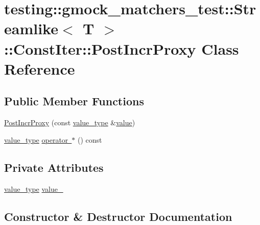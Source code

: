 \hypertarget{classtesting_1_1gmock__matchers__test_1_1_streamlike_1_1_const_iter_1_1_post_incr_proxy}{}\section{testing\+::gmock\+\_\+matchers\+\_\+test\+::Streamlike$<$ T $>$\+::Const\+Iter\+::Post\+Incr\+Proxy Class Reference}
\label{classtesting_1_1gmock__matchers__test_1_1_streamlike_1_1_const_iter_1_1_post_incr_proxy}
\subsection*{Public Member Functions}
\begin{DoxyCompactItemize}
\item 
\mbox{\hyperlink{classtesting_1_1gmock__matchers__test_1_1_streamlike_1_1_const_iter_1_1_post_incr_proxy_a1915f8db9943b0a995c4e01d6120fc80}{Post\+Incr\+Proxy}} (const \mbox{\hyperlink{classtesting_1_1gmock__matchers__test_1_1_streamlike_a7e2c2e021676c1ed5dea63cdd019661c}{value\+\_\+type}} \&\mbox{\hyperlink{_obj__test_2lib_2googletest-master_2googlemock_2test_2gmock-matchers__test_8cc_a337b8a670efc0b086ad3af163f3121b6}{value}})
\item 
\mbox{\hyperlink{classtesting_1_1gmock__matchers__test_1_1_streamlike_a7e2c2e021676c1ed5dea63cdd019661c}{value\+\_\+type}} \mbox{\hyperlink{classtesting_1_1gmock__matchers__test_1_1_streamlike_1_1_const_iter_1_1_post_incr_proxy_a8b1cf42698f3315e9d8c65891bfeb8d7}{operator $\ast$}} () const
\end{DoxyCompactItemize}
\subsection*{Private Attributes}
\begin{DoxyCompactItemize}
\item 
\mbox{\hyperlink{classtesting_1_1gmock__matchers__test_1_1_streamlike_a7e2c2e021676c1ed5dea63cdd019661c}{value\+\_\+type}} \mbox{\hyperlink{classtesting_1_1gmock__matchers__test_1_1_streamlike_1_1_const_iter_1_1_post_incr_proxy_aa04014411e1321be24afff005e2ff09e}{value\+\_\+}}
\end{DoxyCompactItemize}


\subsection{Constructor \& Destructor Documentation}
\mbox{\label{classtesting_1_1gmock__matchers__test_1_1_streamlike_1_1_const_iter_1_1_post_incr_proxy_a1915f8db9943b0a995c4e01d6120fc80}} 
